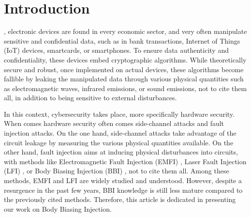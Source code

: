 
\section{Introduction}

	, electronic devices are found in every economic sector, and very often manipulate sensitive and confidential data, such as in bank transactions, Internet of Things (IoT) devices, smartcards, or smartphones.
	To ensure data authenticity and confidentiality, these devices embed cryptographic algorithms.
	While theoretically secure and robust, once implemented on actual devices, these algorithms become fallible by leaking the manipulated data through various physical quantities such as electromagnetic waves, infrared emissions, or sound emissions, not to cite them all, in addition to being sensitive to external disturbances.
	
	In this context, cybersecurity takes place, more specifically hardware security.
	When comes hardware security often comes side-channel attacks and fault injection attacks.
	On the one hand, side-channel attacks take advantage of the circuit leakage by measuring the various physical quantities available.
	On the other hand, fault injection aims at inducing physical disturbances into circuits, with methods like Electromagnetic Fault Injection (EMFI) \cite{mathieuEMFIFirst, mathieuEMFI}, Laser Fault Injection (LFI) \cite{lfiFaultModel}, or Body Biasing Injection (BBI) \cite{bbiOrigin}, not to cite them all.
	Among these methods, EMFI and LFI are widely studied and understood.
	However, despite a resurgence in the past few years, BBI knowledge is still less mature compared to the previously cited methods.
	Therefore, this article is dedicated in presenting our work on Body Biasing Injection.
	
